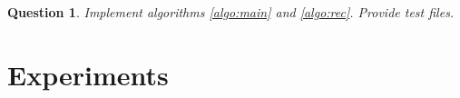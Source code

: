 \documentclass[a4paper, 11pt]{article}
\newtheorem{qu}{Question}
\begin{document}

\begin{qu}
Implement algorithms \ref{algo:main} and \ref{algo:rec}. Provide test files. 
\end{qu}

\section{Experiments}

  

\end{document}
